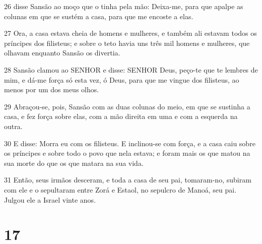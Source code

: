 \par 26 disse Sansão ao moço que o tinha pela mão: Deixa-me, para que apalpe as colunas em que se sustém a casa, para que me encoste a elas.
\par 27 Ora, a casa estava cheia de homens e mulheres, e também ali estavam todos os príncipes dos filisteus; e sobre o teto havia uns três mil homens e mulheres, que olhavam enquanto Sansão os divertia.
\par 28 Sansão clamou ao SENHOR e disse: SENHOR Deus, peço-te que te lembres de mim, e dá-me força só esta vez, ó Deus, para que me vingue dos filisteus, ao menos por um dos meus olhos.
\par 29 Abraçou-se, pois, Sansão com as duas colunas do meio, em que se sustinha a casa, e fez força sobre elas, com a mão direita em uma e com a esquerda na outra.
\par 30 E disse: Morra eu com os filisteus. E inclinou-se com força, e a casa caiu sobre os príncipes e sobre todo o povo que nela estava; e foram mais os que matou na sua morte do que os que matara na sua vida.
\par 31 Então, seus irmãos desceram, e toda a casa de seu pai, tomaram-no, subiram com ele e o sepultaram entre Zorá e Estaol, no sepulcro de Manoá, seu pai. Julgou ele a Israel vinte anos.

\chapter{17}

